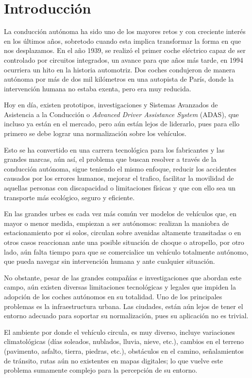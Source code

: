 \section{Introducción}
La conducción  autónoma ha sido uno de los mayores retos y con creciente interés en los últimos años, sobretodo cuando esta implica transformar la forma en que nos desplazamos. En el año 1939, se realizó el primer coche eléctrico capaz de ser controlado por circuitos integrados, un avance para que años más tarde, en 1994 ocurriera un hito en la historia automotriz. Dos coches condujeron de manera autónoma por más de dos mil kilómetros en una autopista de París, donde la intervención humana no estaba exenta, pero era muy reducida.

Hoy en día, existen prototipos, investigaciones y Sistemas Avanzados de Asistencia a la Conducción o \textit{Advanced Driver Assistance System} (ADAS), que incluso ya están en el mercado, pero aún están lejos de liderarlo, pues para ello primero se debe lograr una normalización sobre los vehículos.

Esto se ha convertido en una carrera tecnológica para los fabricantes y las grandes marcas, aún así, el problema que buscan resolver a través de la conducción autónoma, sigue teniendo el mismo enfoque, reducir los accidentes causados por los errores humanos, mejorar el trafico, facilitar la movilidad de aquellas personas con discapacidad o limitaciones físicas y que con ello sea un transporte más ecológico, seguro y eficiente. 

En las grandes urbes es cada vez más común ver modelos de vehículos que, en mayor o menor medida, empiezan a ser autónomos: realizan la maniobra de estacionamiento por si solos, circulan sobre avenidas altamente transitadas o en otros casos reaccionan ante una posible situación de choque o atropello, por otro lado, aún falta tiempo para que se comercialice un vehículo totalmente autónomo, que pueda navegar sin intervención humana y ante cualquier situación.

No obstante, pesar de las grandes compañías e investigaciones que abordan este campo, aún existen diversas limitaciones tecnológicas y legales que impiden la adopción de los coches autónomos en su totalidad. Uno de los principales problemas es la infraestructura urbana. Las ciudades, están aún lejos de tener el entorno adecuado para soportar su normalización, pues su aplicación no es trivial.

El ambiente por donde el vehículo circula, es muy diverso, incluye variaciones climatológicas (días soleados, nublados, lluvia, nieve, etc.), cambios en el terreno (pavimento, asfalto, tierra, piedras, etc.), obstáculos en el camino, señalamientos de tránsito, rutas aún no existentes en mapas digitales; lo que vuelve este problema sumamente complejo para la percepción de su entorno.

